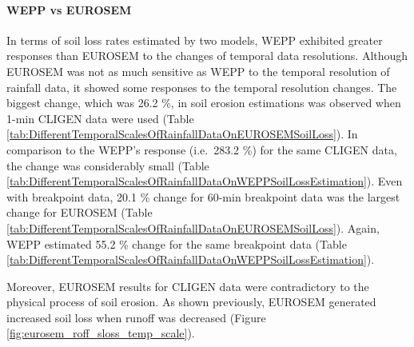 \paragraph{WEPP vs EUROSEM} In terms of soil loss rates estimated by two
models, WEPP exhibited greater responses than EUROSEM to the changes of temporal
data resolutions. Although EUROSEM was not as much sensitive as WEPP to the
temporal
resolution of rainfall data, it showed some responses to the temporal resolution
changes.
The biggest change, which was 26.2 \%, in soil erosion estimations was observed
when 1-min CLIGEN data were used (Table
\ref{tab:DifferentTemporalScalesOfRainfallDataOnEUROSEMSoilLoss}).
In comparison to the WEPP's response (i.e.\ 283.2 \%) for the same CLIGEN data,
the change was considerably small (Table
\ref{tab:DifferentTemporalScalesOfRainfallDataOnWEPPSoilLossEstimation}). Even
with breakpoint data, 20.1 \% change for 60-min breakpoint data was the largest
change for EUROSEM (Table
\ref{tab:DifferentTemporalScalesOfRainfallDataOnEUROSEMSoilLoss}). Again, WEPP
estimated 55.2 \% change for the same breakpoint data (Table
\ref{tab:DifferentTemporalScalesOfRainfallDataOnWEPPSoilLossEstimation}).

Moreover, EUROSEM results for CLIGEN data were contradictory to the physical
process of soil erosion. As shown previously, EUROSEM generated increased soil
loss when runoff was decreased (Figure \ref{fig:eurosem_roff_sloss_temp_scale}).


